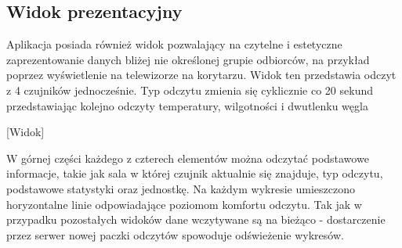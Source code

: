 \subsection{Widok prezentacyjny}
Aplikacja posiada również widok pozwalający na czytelne i estetyczne zaprezentowanie danych bliżej nie określonej grupie odbiorców, na przykład poprzez wyświetlenie
na telewizorze na korytarzu.
Widok ten przedstawia odczyt z 4 czujników jednocześnie. Typ odczytu zmienia się cyklicznie co 20 sekund przedstawiając kolejno odczyty temperatury, wilgotności
i dwutlenku węgla

[Widok]

W górnej części każdego z czterech elementów można odczytać podstawowe informacje, takie jak sala w której czujnik aktualnie się znajduje, typ odczytu, podstawowe
statystyki oraz jednostkę. Na każdym wykresie umieszczono horyzontalne linie odpowiadające poziomom komfortu odczytu. Tak jak w przypadku pozostałych widoków
dane wczytywane są na bieżąco - dostarczenie przez serwer nowej paczki odczytów spowoduje odświeżenie wykresów.